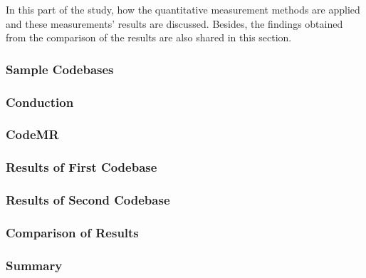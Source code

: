 In this part of the study, how the quantitative measurement methods are applied and these measurements' results are discussed. Besides, the findings obtained from the comparison of the results are also shared in this section.

\subsubsection{Sample Codebases}


\subsubsection{Conduction}


\subsubsection{CodeMR}


\subsubsection{Results of First Codebase}
\subsubsection{Results of Second Codebase}
\subsubsection{Comparison of Results}
\subsubsection{Summary}